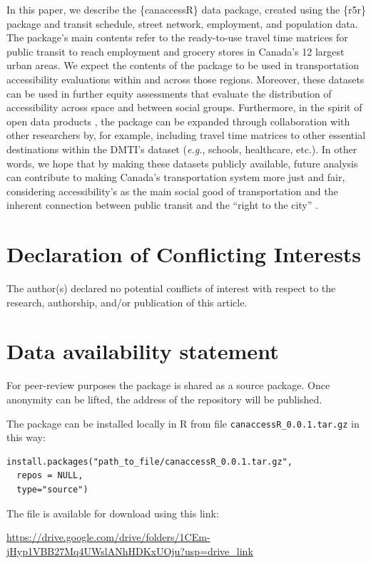 \documentclass[Royal,times,sageh]{sagej}
\begin{document}
In this paper, we describe the \{canaccessR\} data package, created
using the \{r5r\} package and transit schedule, street network,
employment, and population data. The package's main contents refer to
the ready-to-use travel time matrices for public transit to reach
employment and grocery stores in Canada's 12 largest urban areas. We
expect the contents of the package to be used in transportation
accessibility evaluations within and across those regions. Moreover,
these datasets can be used in further equity assessments that evaluate
the distribution of accessibility across space and between social
groups. Furthermore, in the spirit of open data products
\citep{arribas-belOpenDataProductsA2021}, the package can be expanded
through collaboration with other researchers by, for example, including
travel time matrices to other essential destinations within the DMTI's
dataset (\emph{e.g.}, schools, healthcare, etc.). In other words, we
hope that by making these datasets publicly available, future analysis
can contribute to making Canada's transportation system more just and
fair, considering accessibility's as the main social good of
transportation \citep{martensTransportJusticeDesigning2016} and the
inherent connection between public transit and the ``right to the city''
\citep{cogginRightTransportMoving2015}.

\section{Declaration of Conflicting
Interests}\label{declaration-of-conflicting-interests}

The author(s) declared no potential conflicts of interest with respect
to the research, authorship, and/or publication of this article.

\section{Data availability statement}\label{data-availability-statement}

For peer-review purposes the package is shared as a source package. Once
anonymity can be lifted, the address of the repository will be
published.

The package can be installed locally in R from file
\texttt{canaccessR\_0.0.1.tar.gz} in this way:

\begin{verbatim}
install.packages("path_to_file/canaccessR_0.0.1.tar.gz", 
  repos = NULL, 
  type="source")
\end{verbatim}

The file is available for download using this link:

\url{https://drive.google.com/drive/folders/1CEm-jHyp1VBB27Mq4UWslANhHDKxUOju?usp=drive_link}



\end{document}
